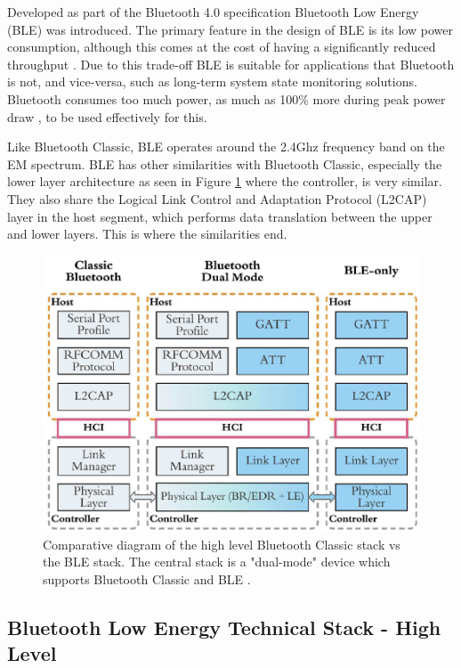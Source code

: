\documentclass{l4proj}
\begin{document}
Developed as part of the Bluetooth 4.0 specification Bluetooth Low Energy (BLE) was introduced. The primary feature in the design of BLE is its low power consumption, although this comes at the cost of having a significantly reduced throughput \citep{gomez_overview_2012}. Due to this trade-off BLE is suitable for applications that Bluetooth is not, and vice-versa, such as long-term system state monitoring solutions. Bluetooth consumes too much power, as much as 100\% more during peak power draw \citep{iot_lab_classic_2020}, to be used effectively for this.

Like Bluetooth Classic, BLE operates around the 2.4Ghz frequency band on the EM spectrum. BLE has other similarities with Bluetooth Classic, especially the lower layer architecture as seen in Figure \ref{fig:bluetooth_stack_comparison} where the controller, is very similar. They also share the Logical Link Control and Adaptation Protocol (L2CAP) layer in the host segment, which performs data translation between the upper and lower layers. This is where the similarities end.

\begin{figure}[!htb]
    \centering
    \includegraphics[width=0.8\linewidth]{images/bluetooth_stacks.png}

    \caption{ Comparative diagram of the high level Bluetooth Classic stack vs the BLE stack. The central stack is a "dual-mode" device which supports Bluetooth Classic and BLE \citep{yang_beyond_2020}. }

    \label{fig:bluetooth_stack_comparison}
\end{figure}

\subsection{Bluetooth Low Energy Technical Stack - High Level}
\end{document}
